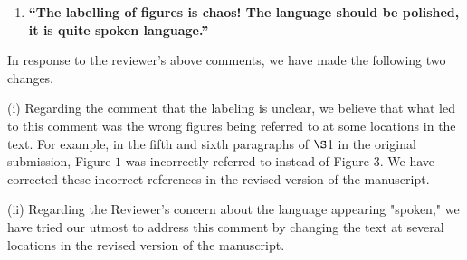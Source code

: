 \documentclass[11pt,letterpaper]{report}
\begin{document}
\begin{enumerate}[label=\textit{1.\arabic*},wide, labelwidth=!, labelindent=0pt]
\begin{enumerate}[label=\textit{2.\arabic*},wide, labelindent=0pt]


\newpage
\item \label{r2c2}{\bf ``The labelling of figures is chaos! The language should be polished, it is quite spoken language.''}
\end{enumerate}

In response to the reviewer's above comments, we have made the following two changes.

(i) Regarding the comment that the labeling is unclear, we believe that what led to this comment was the wrong figures being referred to at some locations in the text. For example, in the fifth and sixth paragraphs of $\S$1 in the original submission, Figure $1$ was incorrectly referred to instead of Figure $3$. We have corrected these incorrect references in the revised version of the manuscript.

(ii) Regarding the Reviewer's concern about the language appearing "spoken," we have tried our utmost to address this comment by changing the text at several locations in the revised version of the manuscript.


\end{enumerate}

\clearpage



\end{document}
